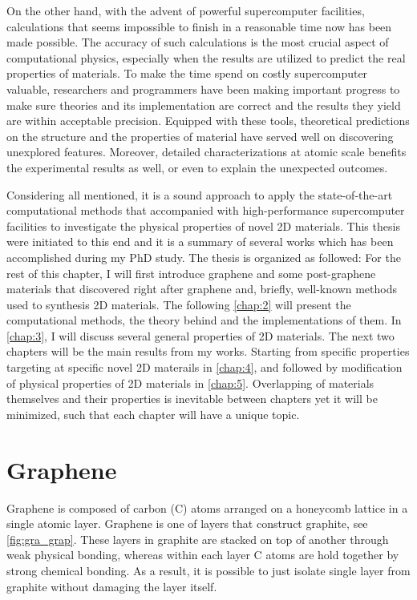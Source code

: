 On the other hand, with the advent of powerful supercomputer facilities, calculations that seems impossible to finish in a reasonable time now has been made possible. The accuracy of such calculations is the most crucial aspect of computational physics, especially when the results are utilized to predict the real properties of materials. To make the time spend on costly supercomputer valuable, researchers and programmers have been making important progress to make sure theories and its implementation are correct and the results they yield are within acceptable precision. Equipped with these tools, theoretical predictions on the structure and the properties of material have served well on discovering unexplored features. Moreover, detailed characterizations at atomic scale benefits the experimental results as well, or even to explain the unexpected outcomes.

Considering all mentioned, it is a sound approach to apply the state-of-the-art computational methods that accompanied with high-performance supercomputer facilities to investigate the physical properties of novel 2D materials. This thesis were initiated to this end and it is a summary of several works which has been accomplished during my PhD study. The thesis is organized as followed: For the rest of this chapter, I will first introduce graphene and some post-graphene materials that discovered right after graphene and, briefly, well-known methods used to synthesis 2D materials. The following \autoref{chap:2} will present the computational methods, the theory behind and the implementations of them. In \autoref{chap:3}, I will discuss several general properties of 2D materials. The next two chapters will be the main results from my works. Starting from specific properties targeting at specific novel 2D materails in \autoref{chap:4}, and followed by modification of physical properties of 2D materials in \autoref{chap:5}. Overlapping of materials themselves and their properties is inevitable between chapters yet it will be minimized, such that each chapter will have a unique topic. 


\section{Graphene}

Graphene is composed of carbon (C) atoms arranged on a honeycomb lattice in a single atomic layer. Graphene is one of layers that construct graphite, see \autoref{fig:gra_grap}. These layers in graphite are stacked on top of another through weak physical bonding, whereas within each layer C atoms are hold together by strong chemical bonding. As a result, it is possible to just isolate single layer from graphite without damaging the layer itself. 

